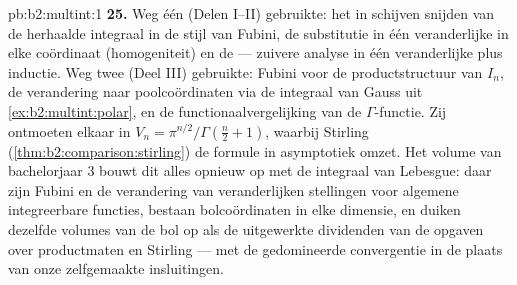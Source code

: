 \begin{solution}{pb:b2:multint:1}
\textbf{25.} Weg één (Delen I--II) gebruikte: het in schijven
snijden van de herhaalde integraal in de stijl van Fubini, de
substitutie in één veranderlijke in elke coördinaat (homogeniteit)
en de  --- zuivere analyse in één
veranderlijke plus inductie. Weg twee (Deel III) gebruikte: Fubini
voor de productstructuur van $I_n$, de verandering naar
poolcoördinaten via de integraal van Gauss uit
\cref{ex:b2:multint:polar}, en de functionaalvergelijking van de
$\Gamma$-functie. Zij ontmoeten elkaar in $V_n =
\pi^{n/2}/\Gamma(\frac n2 + 1)$, waarbij Stirling
(\cref{thm:b2:comparison:stirling}) de formule in asymptotiek
omzet. Het volume van bachelorjaar 3 bouwt dit alles opnieuw op met
de integraal van Lebesgue: daar zijn Fubini en de verandering van
veranderlijken stellingen voor algemene integreerbare functies,
bestaan bolcoördinaten in elke dimensie, en duiken dezelfde volumes
van de bol op als de uitgewerkte dividenden van de opgaven over
productmaten en Stirling --- met de gedomineerde convergentie in de
plaats van onze zelfgemaakte insluitingen.
\end{solution}
